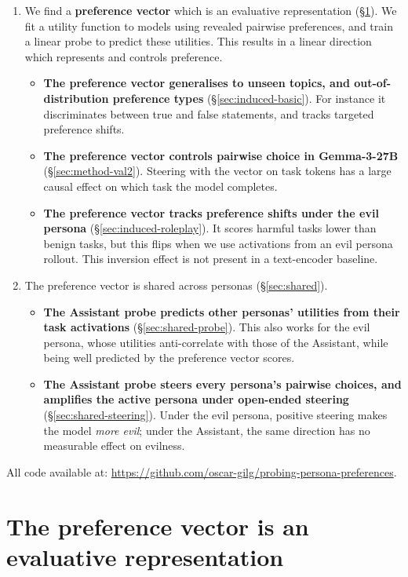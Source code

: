 \documentclass{article}
\begin{document}
\begin{enumerate}
\item We find a \textbf{preference vector} which is an evaluative representation (\S\ref{sec:method}). We fit a utility function to models using revealed pairwise preferences, and train a linear probe to predict these utilities. This results in a linear direction which represents and controls preference.
\begin{itemize}
    \item \textbf{The preference vector generalises to unseen topics, and out-of-distribution preference types} (\S\ref{sec:induced-basic}). For instance it discriminates between true and false statements, and tracks targeted preference shifts.
    \item \textbf{The preference vector controls pairwise choice in Gemma-3-27B} (\S\ref{sec:method-val2}). Steering with the vector on task tokens has a large causal effect on which task the model completes.
    \item \textbf{The preference vector tracks preference shifts under the evil persona} (\S\ref{sec:induced-roleplay}). It scores harmful tasks lower than benign tasks, but this flips when we use activations from an evil persona rollout. This inversion effect is not present in a text-encoder baseline.
\end{itemize}
\item The preference vector is shared across personas (\S\ref{sec:shared}).
\begin{itemize}
    \item \textbf{The Assistant probe predicts other personas' utilities from their task activations} (\S\ref{sec:shared-probe}). This also works for the evil persona, whose utilities anti-correlate with those of the Assistant, while being well predicted by the preference vector scores.
    \item \textbf{The Assistant probe steers every persona's pairwise choices, and amplifies the active persona under open-ended steering} (\S\ref{sec:shared-steering}). Under the evil persona, positive steering makes the model \textit{more evil}; under the Assistant, the same direction has no measurable effect on evilness.
\end{itemize}
\end{enumerate}

All code available at: \url{https://github.com/oscar-gilg/probing-persona-preferences}.

\section{The preference vector is an evaluative representation}
\label{sec:method}
\end{document}

